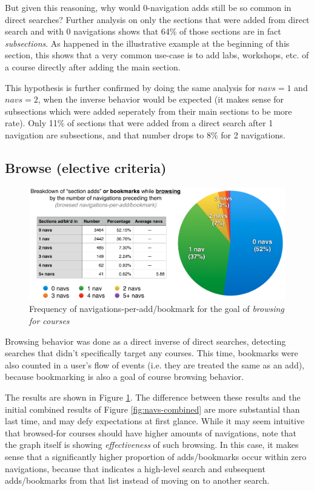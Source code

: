   But given this reasoning, why would 0-navigation adds still be so common in direct searches? Further analysis on only the sections that were added from direct search and with 0 navigations shows that 64\% of those sections are in fact \emph{subsections}. As happened in the illustrative example at the beginning of this section, this shows that a very common use-case is to add labs, workshops, etc. of a course directly after adding the main section.

  This hypothesis is further confirmed by doing the same analysis for ${navs}=1$ and ${navs}=2$, when the inverse behavior would be expected (it makes sense for subsections which were added seperately from their main sections to be more rate). Only 11\% of sections that were added from a direct search after 1 navigation are subsections, and that number drops to 8\% for 2 navigations.

\subsection{Browse (elective criteria)}

  \begin{figure}
    \centering
    \includegraphics[width=1.0\textwidth]{images/graph/browsed_navs}

    \caption{Frequency of navigations-per-add/bookmark for the goal of \emph{browsing for courses}}
    \label{fig:navs-browse}
  \end{figure}

  Browsing behavior was done as a direct inverse of direct searches, detecting searches that didn't specifically target any courses. This time, bookmarks were also counted in a user's flow of events (i.e. they are treated the same as an add), because bookmarking is also a goal of course browsing behavior.

  The results are shown in Figure \ref{fig:navs-browse}. The difference between these results and the initial combined results of Figure \ref{fig:navs-combined} are more substantial than last time, and may defy expectations at first glance. While it may seem intuitive that browsed-for courses should have higher amounts of navigations, note that the graph itself is showing \emph{effectiveness} of such browsing. In this case, it makes sense that a significantly higher proportion of adds/bookmarks occur within zero navigations, because that indicates a high-level search and subsequent adds/bookmarks from that list instead of moving on to another search.

